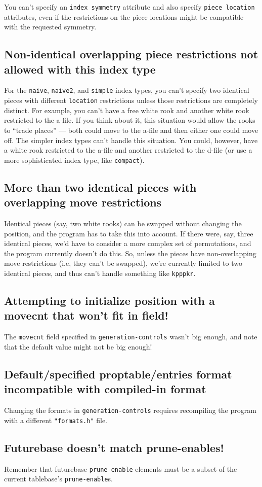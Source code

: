 \documentclass[11pt]{article}
\begin{document}
You can't specify an {\tt index symmetry} attribute and also specify
{\tt piece location} attributes, even if the restrictions on the piece
locations might be compatible with the requested symmetry.

\subsection{Non-identical overlapping piece restrictions not allowed with this index type}

For the {\tt naive}, {\tt naive2}, and {\tt simple} index types, you
can't specify two identical pieces with different {\tt location}
restrictions unless those restrictions are completely distinct.  For
example, you can't have a free white rook and another white rook
restricted to the a-file.  If you think about it, this situation would
allow the rooks to ``trade places'' --- both could move to the a-file
and then either one could move off.  The simpler index types can't
handle this situation.  You could, however, have a white rook
restricted to the a-file and another restricted to the d-file (or use
a more sophisticated index type, like {\tt compact}).

\subsection{More than two identical pieces with overlapping move restrictions}

Identical pieces (say, two white rooks) can be swapped without
changing the position, and the program has to take this into account.
If there were, say, three identical pieces, we'd have to consider a
more complex set of permutations, and the program currently doesn't do
this.  So, unless the pieces have non-overlapping move restrictions
(i.e, they can't be swapped), we're currently limited to two identical
pieces, and thus can't handle something like {\tt kpppkr}.

\subsection{Attempting to initialize position with a movecnt that won't fit in field!}

The {\tt movecnt} field specified in {\tt generation-controls} wasn't big enough,
and note that the default value might not be big enough!

\subsection{Default/specified proptable/entries format incompatible with compiled-in format}

Changing the formats in {\tt generation-controls} requires recompiling
the program with a different {\tt "formats.h"} file.

\subsection{Futurebase doesn't match prune-enables!}

Remember that futurebase {\tt prune-enable} elements must be a
subset of the current tablebase's {\tt prune-enable}s.
\end{document}
